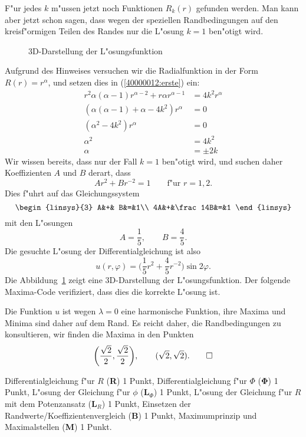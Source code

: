 \begin{loesung}
\begin{teilaufgaben}
F"ur jedes $k$ m"ussen jetzt noch Funktionen $R_k(r)$ gefunden werden.
Man kann aber jetzt schon sagen, dass wegen der speziellen Randbedingungen
auf den kreisf"ormigen Teilen des Randes nur die L"osung $k=1$ ben"otigt wird.

\begin{figure}
\centering
{}
\caption{3D-Darstellung der L"osungsfunktion
\label{40000012:3d}}
\end{figure}
Aufgrund des Hinweises versuchen wir die Radialfunktion in der Form
$R(r)=r^\alpha$, und setzen dies in (\ref{40000012:erste}) ein:
\begin{align*}
r^2\alpha(\alpha-1)r^{\alpha-2}+r\alpha r^{\alpha-1}&=4k^2r^{\alpha}
\\
(\alpha(\alpha-1)+\alpha -4k^2)r^{\alpha}&=0
\\
(\alpha^2 -4k^2)r^{\alpha}&=0
\\
\alpha^2&=4k^2
\\
\alpha&=\pm2k
\end{align*}
Wir wissen bereits, dass nur der Fall $k=1$ ben"otigt wird, und suchen
daher Koeffizienten $A$ und $B$ derart, dass
\[
Ar^2+Br^{-2}=1\qquad \text{f"ur $r=1,2$.}
\]
Dies f"uhrt auf das Gleichungssystem
\[
\begin{linsys}{3}
 A&+&       B&=&1\\
4A&+&\frac14B&=&1
\end{linsys}
\]
mit den L"osungen
\[
A=\frac15,\qquad B=\frac45.
\]
Die gesuchte L"osung der Differentialgleichung ist also
\[
u(r,\varphi)=\biggl(\frac15r^2+\frac45r^{-2}\biggr)\sin 2\varphi.
\]
Die Abbildung~\ref{40000012:3d} zeigt eine 3D-Darstellung der L"osungsfunktion.
Der folgende Maxima-Code verifiziert, dass dies die korrekte L"osung ist.
\item
Die Funktion $u$ ist wegen $\lambda=0$ eine harmonische Funktion, ihre
Maxima und Minima sind daher auf dem Rand.
Es reicht daher, die Randbedingungen zu konsultieren, wir finden die
Maxima in den Punkten
\[
\biggl(\frac{\sqrt{2}}{2},\frac{\sqrt{2}}2\biggr),\qquad
(\sqrt{2},\sqrt{2}).
\qedhere
\]
\end{teilaufgaben}
\end{loesung}

\begin{bewertung}
Differentialgleichung f"ur $R$ ({\bf R}) 1 Punkt,
Differentialgleichung f"ur $\Phi$ ({$\mathbf \Phi$}) 1 Punkt,
L"osung der Gleichung f"ur $\phi$ ($\textbf{L}_\Phi$) 1 Punkt,
L"osung der Gleichung f"ur $R$ mit dem Potenzansatz ($\textbf{L}_R$) 1 Punkt,
Einsetzen der Randwerte/Koeffizientenvergleich ({\bf B}) 1 Punkt,
Maximumprinzip und Maximalstellen ({\bf M}) 1 Punkt.
\end{bewertung}


